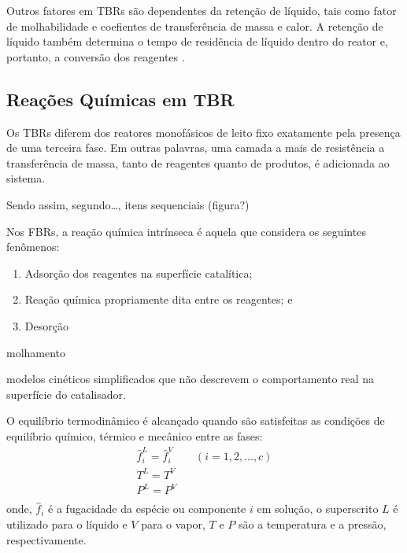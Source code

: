 Outros fatores em TBRs são dependentes da retenção de líquido, tais como fator
de molhabilidade e coefientes de transferência de massa e calor. A retenção de
líquido também determina o tempo de residência de líquido dentro do reator e,
portanto, a conversão dos reagentes \cite{Ranade2011}.


\subsection{Reações Químicas em TBR} \label{sec:reacoes}
 
Os TBRs diferem dos reatores monofásicos de leito fixo exatamente pela presença
de uma terceira fase. Em outras palavras, uma camada a mais de resistência a
transferência de massa, tanto de reagentes quanto de produtos, é adicionada
ao sistema. 

Sendo assim, segundo\ldots, itens sequenciais (figura?)

Nos FBRs, a reação química intrínseca é aquela que considera os
seguintes fenômenos:
\begin{enumerate}
\item Adsorção dos reagentes na superfície catalítica; 
\item Reação química propriamente dita entre os reagentes; e
\item Desorção
\end{enumerate}  

molhamento

modelos cinéticos simplificados que não descrevem o comportamento real na
superfície do catalisador.

 

O equilíbrio termodinâmico é alcançado quando são satisfeitas as condições de equilíbrio químico, térmico e
mecânico entre as fases:
\begin{equation}
\begin{array}{c}
\hat{f}^L_i = \hat{f}^V_i \qquad (i = 1,2,...,c) \\
T^L = T^V \\
P^L = P^V \\
\end{array}
\end{equation}
onde, $\hat{f}_i$ é a fugacidade da espécie ou componente $i$ em solução, o superscrito
$L$ é utilizado para o líquido e $V$ para o vapor, $T$ e $P$ são a temperatura
e a pressão, respectivamente.


